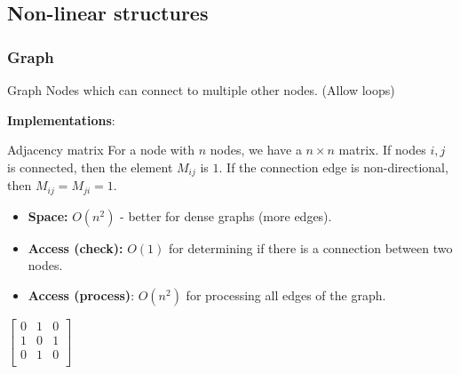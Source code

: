 \subsection{Non-linear structures}
\label{subsec:nonlinear-structures}

\subsubsection{Graph}

\begin{definition}
    {Graph}
    Nodes which can connect to multiple other nodes. (Allow loops)
\end{definition}

\textbf{Implementations}:

\begin{theorem}
    {Adjacency matrix}
    For a node with $n$ nodes, we have a $n \times n$ matrix. If nodes $i,j$ is connected, then the element $M_{ij}$ is $1$. If the connection edge is non-directional, then $M_{ij} = M_{ji} = 1$.

    \begin{itemize}
        \item \textbf{Space:} $O(n^2)$ - better for dense graphs (more edges).
        \item \textbf{Access (check):} $O(1)$ for determining if there is a connection between two nodes.
        \item \textbf{Access (process)}: $O(n^2)$ for processing all edges of the graph.
    \end{itemize}

    \tcblower

    \begin{center}
        \hspace{1cm}
        $
            \begin{bmatrix}
                0 & 1 & 0 \\
                1 & 0 & 1 \\
                0 & 1 & 0 \\
            \end{bmatrix}
        $
    \end{center}

\end{theorem}

